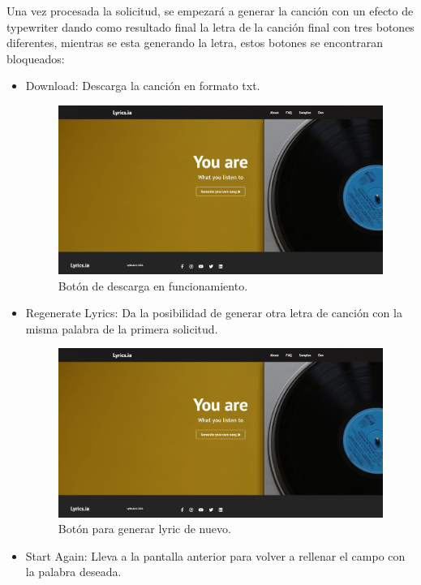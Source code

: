 \documentclass[12pt, a4paper, titlepage]{article}
\begin{document}
	Una vez procesada la solicitud, se empezará a generar la canción con un efecto de typewriter dando como resultado final la letra de la canción final con tres botones diferentes, mientras se esta generando la letra, estos botones se encontraran bloqueados:
	\begin{itemize}
		\item Download: Descarga la canción en formato txt.
		
		\begin{figure}[H] 
			\includegraphics[width=13.5cm]{./Imagenes/Capturas/x.png}
			\centering \caption{Botón de descarga en funcionamiento.}
		\end{figure}
		
		\item Regenerate Lyrics: Da la posibilidad de generar otra letra de canción con la misma palabra de la primera solicitud.
		
		\begin{figure}[H] 
			\includegraphics[width=13.5cm]{./Imagenes/Capturas/x.png}
			\centering \caption{Botón para generar lyric de nuevo.}
		\end{figure}
		
		\item Start Again: Lleva a la pantalla anterior para volver a rellenar el campo con la palabra deseada.
		

\end{itemize}
\end{document}
